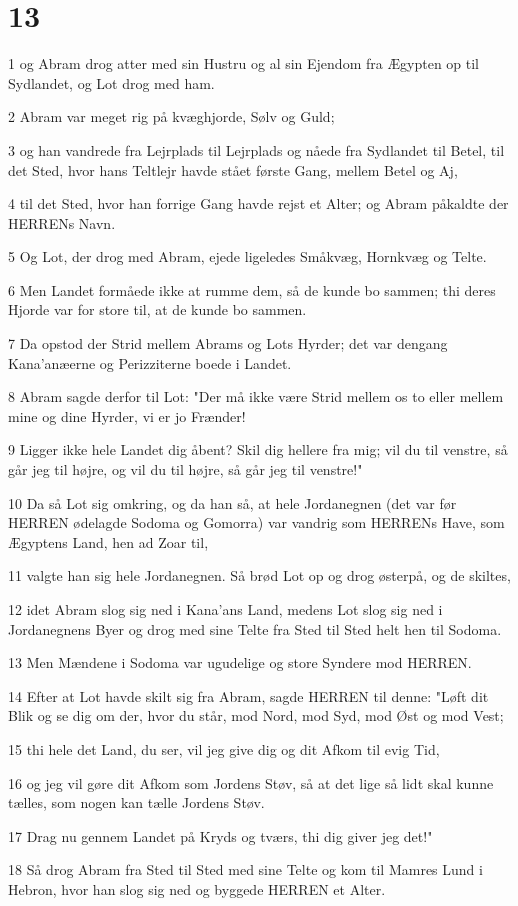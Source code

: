 \chapter{13}

\par 1 og Abram drog atter med sin Hustru og al sin Ejendom fra Ægypten op til Sydlandet, og Lot drog med ham.
\par 2 Abram var meget rig på kvæghjorde, Sølv og Guld;
\par 3 og han vandrede fra Lejrplads til Lejrplads og nåede fra Sydlandet til Betel, til det Sted, hvor hans Teltlejr havde stået første Gang, mellem Betel og Aj,
\par 4 til det Sted, hvor han forrige Gang havde rejst et Alter; og Abram påkaldte der HERRENs Navn.
\par 5 Og Lot, der drog med Abram, ejede ligeledes Småkvæg, Hornkvæg og Telte.
\par 6 Men Landet formåede ikke at rumme dem, så de kunde bo sammen; thi deres Hjorde var for store til, at de kunde bo sammen.
\par 7 Da opstod der Strid mellem Abrams og Lots Hyrder; det var dengang Kana'anæerne og Perizziterne boede i Landet.
\par 8 Abram sagde derfor til Lot: "Der må ikke være Strid mellem os to eller mellem mine og dine Hyrder, vi er jo Frænder!
\par 9 Ligger ikke hele Landet dig åbent? Skil dig hellere fra mig; vil du til venstre, så går jeg til højre, og vil du til højre, så går jeg til venstre!"
\par 10 Da så Lot sig omkring, og da han så, at hele Jordanegnen (det var før HERREN ødelagde Sodoma og Gomorra) var vandrig som HERRENs Have, som Ægyptens Land, hen ad Zoar til,
\par 11 valgte han sig hele Jordanegnen. Så brød Lot op og drog østerpå, og de skiltes,
\par 12 idet Abram slog sig ned i Kana'ans Land, medens Lot slog sig ned i Jordanegnens Byer og drog med sine Telte fra Sted til Sted helt hen til Sodoma.
\par 13 Men Mændene i Sodoma var ugudelige og store Syndere mod HERREN.
\par 14 Efter at Lot havde skilt sig fra Abram, sagde HERREN til denne: "Løft dit Blik og se dig om der, hvor du står, mod Nord, mod Syd, mod Øst og mod Vest;
\par 15 thi hele det Land, du ser, vil jeg give dig og dit Afkom til evig Tid,
\par 16 og jeg vil gøre dit Afkom som Jordens Støv, så at det lige så lidt skal kunne tælles, som nogen kan tælle Jordens Støv.
\par 17 Drag nu gennem Landet på Kryds og tværs, thi dig giver jeg det!"
\par 18 Så drog Abram fra Sted til Sted med sine Telte og kom til Mamres Lund i Hebron, hvor han slog sig ned og byggede HERREN et Alter.

